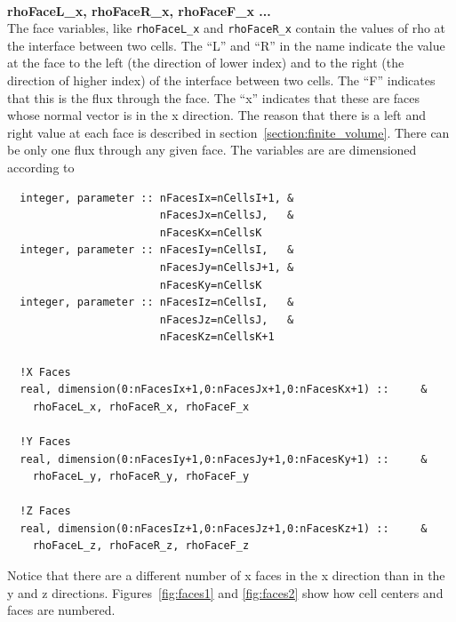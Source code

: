 \ \ \\
{\bf rhoFaceL\_x, rhoFaceR\_x, rhoFaceF\_x ...}  \\
The face variables, like 
{\tt rhoFaceL\_x} and {\tt rhoFaceR\_x} contain the values of rho at the
interface between two cells.  The ``L'' and ``R'' in the name indicate
the value at the face to the left (the direction of lower index) and
to the right (the direction of higher index) of the interface between two
cells. 
The ``F'' indicates that this is the flux through the face. The ``x''
indicates that these are faces whose normal vector is in the x direction.
The reason that there is a left and right value at each face 
is described in section~\ref{section:finite_volume}.  There can be
only one flux through any given face.  The variables are
are dimensioned according to
\begin{verbatim}
  integer, parameter :: nFacesIx=nCellsI+1, &
                        nFacesJx=nCellsJ,   &
                        nFacesKx=nCellsK
  integer, parameter :: nFacesIy=nCellsI,   &
                        nFacesJy=nCellsJ+1, &
                        nFacesKy=nCellsK
  integer, parameter :: nFacesIz=nCellsI,   &
                        nFacesJz=nCellsJ,   &
                        nFacesKz=nCellsK+1

  !X Faces
  real, dimension(0:nFacesIx+1,0:nFacesJx+1,0:nFacesKx+1) ::     &
    rhoFaceL_x, rhoFaceR_x, rhoFaceF_x

  !Y Faces
  real, dimension(0:nFacesIy+1,0:nFacesJy+1,0:nFacesKy+1) ::     &
    rhoFaceL_y, rhoFaceR_y, rhoFaceF_y

  !Z Faces
  real, dimension(0:nFacesIz+1,0:nFacesJz+1,0:nFacesKz+1) ::     &
    rhoFaceL_z, rhoFaceR_z, rhoFaceF_z
\end{verbatim}
Notice that there are a different number of x faces in the x direction
than in the y and z directions. Figures~\ref{fig:faces1} and \ref{fig:faces2}
show how cell centers and faces are numbered.
